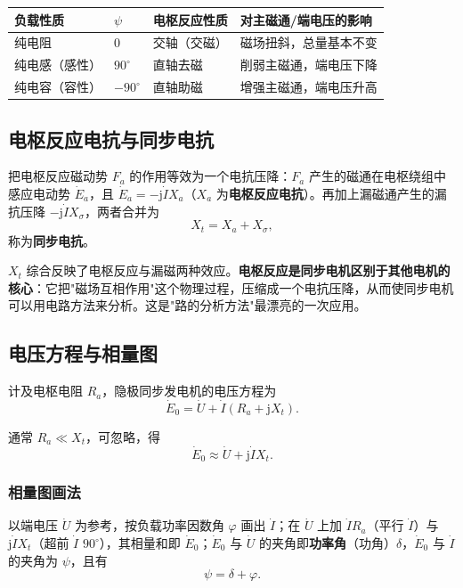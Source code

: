 \begin{center}
\begin{tabular}{@{}llll@{}}
\toprule
负载性质 & $\psi$ & 电枢反应性质 & 对主磁通/端电压的影响 \\
\midrule
纯电阻 & $0$ & 交轴（交磁） & 磁场扭斜，总量基本不变 \\
纯电感（感性） & $90^\circ$ & 直轴去磁 & 削弱主磁通，端电压下降 \\
纯电容（容性） & $-90^\circ$ & 直轴助磁 & 增强主磁通，端电压升高 \\
\bottomrule
\end{tabular}
\end{center}

\subsection{电枢反应电抗与同步电抗}
把电枢反应磁动势 $F_a$ 的作用等效为一个电抗压降：$F_a$ 产生的磁通在电枢绕组中感应电动势 $\dot E_a$，且 $\dot E_a=-\mathrm{j}\dot I X_a$（$X_a$ 为\textbf{电枢反应电抗}）。再加上漏磁通产生的漏抗压降 $-\mathrm{j}\dot I X_\sigma$，两者合并为
\begin{equation}
X_t=X_a+X_\sigma ,
\end{equation}
称为\textbf{同步电抗}。


$X_t$ 综合反映了电枢反应与漏磁两种效应。\textbf{电枢反应是同步电机区别于其他电机的核心}：它把"磁场互相作用"这个物理过程，压缩成一个电抗压降，从而使同步电机可以用电路方法来分析。这是"路的分析方法"最漂亮的一次应用。

\subsection{电压方程与相量图}
计及电枢电阻 $R_a$，隐极同步发电机的电压方程为
\begin{equation}
\dot E_0=\dot U+\dot I\left(R_a+\mathrm{j}X_t\right).
\end{equation}


通常 $R_a\ll X_t$，可忽略，得
\begin{equation}
\dot E_0\approx\dot U+\mathrm{j}\dot I X_t .
\end{equation}

\subsubsection{相量图画法}
以端电压 $\dot U$ 为参考，按负载功率因数角 $\varphi$ 画出 $\dot I$；在 $\dot U$ 上加 $\dot I R_a$（平行 $\dot I$）与 $\mathrm{j}\dot I X_t$（超前 $\dot I$ $90^\circ$），其相量和即 $\dot E_0$；$\dot E_0$ 与 $\dot U$ 的夹角即\textbf{功率角}（功角）$\delta$，$\dot E_0$ 与 $\dot I$ 的夹角为 $\psi$，且有
\begin{equation}
\psi=\delta+\varphi .
\end{equation}

